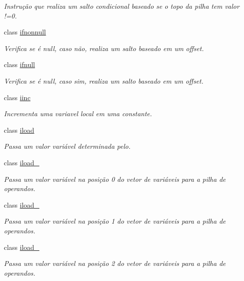 \begin{DoxyCompactItemize}
\begin{DoxyCompactList}\small\item\em Instrução que realiza um salto condicional baseado se o topo da pilha tem valor !=0. \end{DoxyCompactList}\item 
class \hyperlink{class_instruction_impl_1_1ifnonnull}{ifnonnull}
\begin{DoxyCompactList}\small\item\em Verifica se é null, caso não, realiza um salto baseado em um offset. \end{DoxyCompactList}\item 
class \hyperlink{class_instruction_impl_1_1ifnull}{ifnull}
\begin{DoxyCompactList}\small\item\em Verifica se é null, caso sim, realiza um salto baseado em um offset. \end{DoxyCompactList}\item 
class \hyperlink{class_instruction_impl_1_1iinc}{iinc}
\begin{DoxyCompactList}\small\item\em Incrementa uma variavel local em uma constante. \end{DoxyCompactList}\item 
class \hyperlink{class_instruction_impl_1_1iload}{iload}
\begin{DoxyCompactList}\small\item\em Passa um valor variável determinada pelo. \end{DoxyCompactList}\item 
class \hyperlink{class_instruction_impl_1_1iload__0}{iload\+\_}
\begin{DoxyCompactList}\small\item\em Passa um valor variável na posição 0 do vetor de variáveis para a pilha de operandos. \end{DoxyCompactList}\item 
class \hyperlink{class_instruction_impl_1_1iload__1}{iload\+\_}
\begin{DoxyCompactList}\small\item\em Passa um valor variável na posição 1 do vetor de variáveis para a pilha de operandos. \end{DoxyCompactList}\item 
class \hyperlink{class_instruction_impl_1_1iload__2}{iload\+\_}
\begin{DoxyCompactList}\small\item\em Passa um valor variável na posição 2 do vetor de variáveis para a pilha de operandos. \end{DoxyCompactList}\item 

\end{DoxyCompactItemize}
